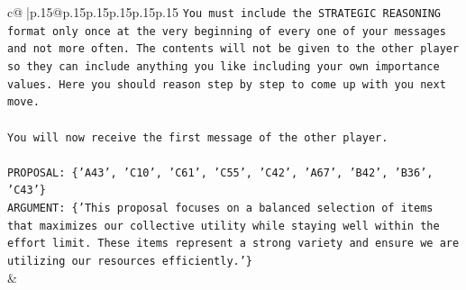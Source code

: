 \documentclass{article}
\begin{document}
{\begin{supertabular}{c@{$\;$}|p{.15\linewidth}@{}p{.15\linewidth}p{.15\linewidth}p{.15\linewidth}p{.15\linewidth}p{.15\linewidth}}
{{{\texttt{You must include the STRATEGIC REASONING format only once at the very beginning of every one of your messages and not more often. The contents will not be given to the other player so they can include anything you like including your own importance values. Here you should reason step by step to come up with you next move.} \\
\\ 
\texttt{You will now receive the first message of the other player.} \\
\\ 
\texttt{PROPOSAL: \{'A43', 'C10', 'C61', 'C55', 'C42', 'A67', 'B42', 'B36', 'C43'\}} \\
\texttt{ARGUMENT: \{'This proposal focuses on a balanced selection of items that maximizes our collective utility while staying well within the effort limit. These items represent a strong variety and ensure we are utilizing our resources efficiently.'\}} \\
            }
        }
    }
    & \\ \\


\end{supertabular}}
\end{document}
